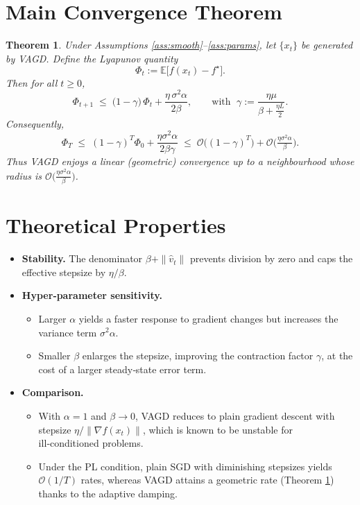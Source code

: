 \documentclass{article}
\newtheorem{theorem}{Theorem}
\newcommand{\E}{\mathbb{E}}
\begin{document}
\section*{Main Convergence Theorem}
\begin{theorem}\label{thm:linear}
Under Assumptions \ref{ass:smooth}–\ref{ass:params}, let $\{x_t\}$ be generated by VAGD. Define the Lyapunov quantity
\[
    \Phi_t := \E\!\bigl[ f(x_t)-f^\star \bigr] .
\]
Then for all $t\ge 0$,
\[
    \Phi_{t+1} \;\le\; \bigl(1-\gamma\bigr)\,\Phi_t + \frac{\eta\,\sigma^2\alpha}{2\beta},
\qquad
\text{with }\;
\gamma := \frac{\eta\mu}{\beta+ \frac{\eta L}{2}} .
\tag{6}
\]
Consequently,
\[
    \Phi_T \;\le\; (1-\gamma)^T\Phi_0 + \frac{\eta\sigma^2\alpha}{2\beta\gamma}
    \;\le\; \mathcal{O}\!\bigl((1-\gamma)^T\bigr) + \mathcal{O}\!\bigl(\tfrac{\eta\sigma^2\alpha}{\beta}\bigr).
\tag{7}
\]
Thus VAGD enjoys a linear (geometric) convergence up to a neighbourhood whose radius is $\mathcal{O}\bigl(\frac{\eta\sigma^2\alpha}{\beta}\bigr)$.
\end{theorem}

\section*{Theoretical Properties}
\begin{itemize}[leftmargin=*]
\item \textbf{Stability.} The denominator $\beta+\|\hat v_t\|$ prevents division by zero and caps the effective stepsize by $\eta/\beta$.
\item \textbf{Hyper‑parameter sensitivity.}
    \begin{itemize}
        \item Larger $\alpha$ yields a faster response to gradient changes but increases the variance term $\sigma^2\alpha$.
        \item Smaller $\beta$ enlarges the stepsize, improving the contraction factor $\gamma$, at the cost of a larger steady‑state error term.
    \end{itemize}
\item \textbf{Comparison.}
    \begin{itemize}
        \item With $\alpha=1$ and $\beta\to 0$, VAGD reduces to plain gradient descent with stepsize $\eta/\|\nabla f(x_t)\|$, which is known to be unstable for ill‑conditioned problems.
        \item Under the PL condition, plain SGD with diminishing stepsizes yields $\mathcal{O}(1/T)$ rates, whereas VAGD attains a geometric rate (Theorem \ref{thm:linear}) thanks to the adaptive damping.
    \end{itemize}
\end{itemize}
\end{document}
